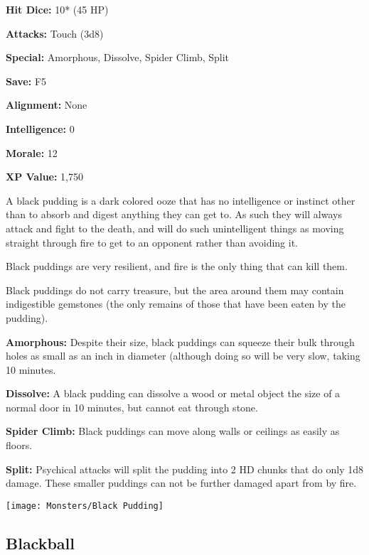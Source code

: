 \begin{multicols*}{2}
{\textbf{Hit Dice:} 10* (45 HP)

\textbf{Attacks:} Touch (3d8)

\textbf{Special:} Amorphous, Dissolve, Spider Climb, Split

\textbf{Save:} F5

\textbf{Alignment:} None

\textbf{Intelligence:} 0

\textbf{Morale:} 12

\textbf{XP Value:} 1,750}

A black pudding is a dark colored ooze that has no intelligence or instinct other than to absorb and digest anything they can get to. As such they will always attack and fight to the death, and will do such unintelligent things as moving straight through fire to get to an opponent rather than avoiding it.

Black puddings are very resilient, and fire is the only thing that can kill them.

Black puddings do not carry treasure, but the area around them may contain indigestible gemstones (the only remains of those that have been eaten by the pudding).

\textbf{Amorphous:} Despite their size, black puddings can squeeze their bulk through holes as small as an inch in diameter (although doing so will be very slow, taking 10 minutes.

\textbf{Dissolve:} A black pudding can dissolve a wood or metal object the size of a normal door in 10 minutes, but cannot eat through stone.

\textbf{Spider Climb:} Black puddings can move along walls or ceilings as easily as floors.

\textbf{Split:} Psychical attacks will split the pudding into 2 HD chunks that do only 1d8 damage. These smaller puddings can not be further damaged apart from by fire.

\texttt{[image: Monsters/Black Pudding]}

\subsection{Blackball}
\end{multicols*}
